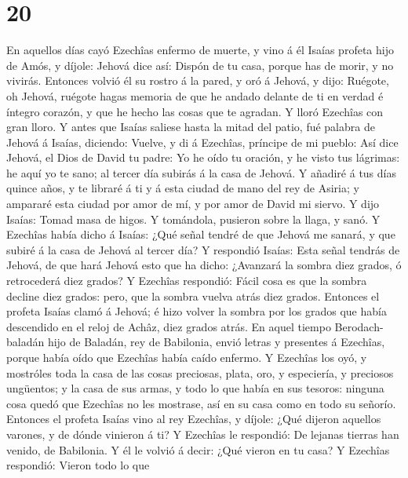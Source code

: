 \hypertarget{section-19}{%
\section{20}\label{section-19}}

 En aquellos días cayó Ezechîas enfermo de muerte, y vino á
él Isaías profeta hijo de Amós, y díjole: Jehová dice así: Dispón de tu
casa, porque has de morir, y no vivirás.  Entonces volvió él
su rostro á la pared, y oró á Jehová, y dijo:  Ruégote, oh
Jehová, ruégote hagas memoria de que he andado delante de ti en verdad é
íntegro corazón, y que he hecho las cosas que te agradan. Y lloró
Ezechîas con gran lloro.  Y antes que Isaías saliese hasta
la mitad del patio, fué palabra de Jehová á Isaías, diciendo:
 Vuelve, y di á Ezechîas, príncipe de mi pueblo: Así dice
Jehová, el Dios de David tu padre: Yo he oído tu oración, y he visto tus
lágrimas: he aquí yo te sano; al tercer día subirás á la casa de Jehová.
 Y añadiré á tus días quince años, y te libraré á ti y á
esta ciudad de mano del rey de Asiria; y ampararé esta ciudad por amor
de mí, y por amor de David mi siervo.  Y dijo Isaías: Tomad
masa de higos. Y tomándola, pusieron sobre la llaga, y sanó.
 Y Ezechîas había dicho á Isaías: ¿Qué señal tendré de que
Jehová me sanará, y que subiré á la casa de Jehová al tercer día?
 Y respondió Isaías: Esta señal tendrás de Jehová, de que
hará Jehová esto que ha dicho: ¿Avanzará la sombra diez grados, ó
retrocederá diez grados?  Y Ezechîas respondió: Fácil cosa
es que la sombra decline diez grados: pero, que la sombra vuelva atrás
diez grados.  Entonces el profeta Isaías clamó á Jehová; é
hizo volver la sombra por los grados que había descendido en el reloj de
Achâz, diez grados atrás.  En aquel tiempo Berodach-baladán
hijo de Baladán, rey de Babilonia, envió letras y presentes á Ezechîas,
porque había oído que Ezechîas había caído enfermo.  Y
Ezechîas los oyó, y mostróles toda la casa de las cosas preciosas,
plata, oro, y especiería, y preciosos ungüentos; y la casa de sus armas,
y todo lo que había en sus tesoros: ninguna cosa quedó que Ezechîas no
les mostrase, así en su casa como en todo su señorío. 
Entonces el profeta Isaías vino al rey Ezechîas, y díjole: ¿Qué dijeron
aquellos varones, y de dónde vinieron á ti? Y Ezechîas le respondió: De
lejanas tierras han venido, de Babilonia.  Y él le volvió á
decir: ¿Qué vieron en tu casa? Y Ezechîas respondió: Vieron todo lo que

